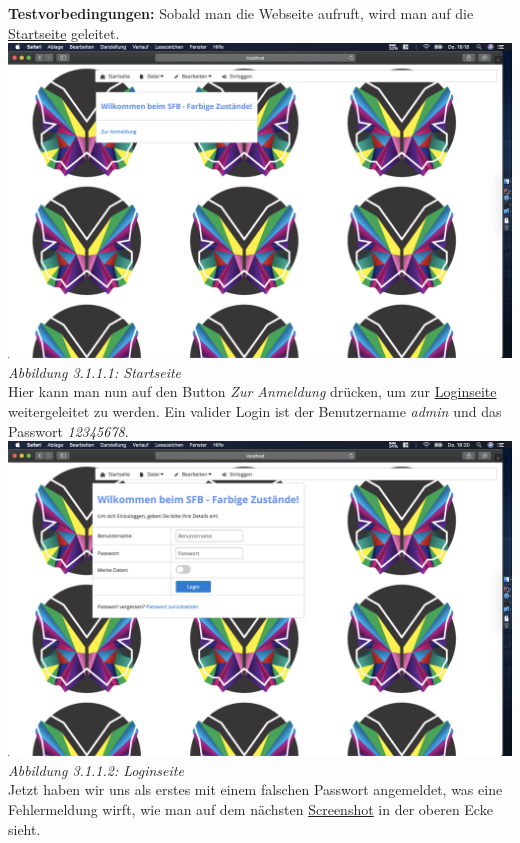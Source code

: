 \documentclass[enabledeprecatedfontcommands,fontsize=12pt,paper=a4,twoside]{scrartcl}
\begin{document}
\textbf{Testvorbedingungen:} Sobald man die Webseite aufruft, wird man auf die \hyperlink{sc3.1.1.1}{Startseite}  geleitet. \\

\hypertarget{sc3.1.1.1}{
\includegraphics[width=1\textwidth]{Screenshots/311StartSite.png}
\textit{Abbildung 3.1.1.1: Startseite}
} \\

Hier kann man nun auf den Button \textit{Zur Anmeldung} drücken, um zur \hyperlink{sc3.1.1.2}{Loginseite} weitergeleitet zu werden. Ein valider Login ist der Benutzername \textit{admin} und das Passwort \textit{12345678}. \\

\hypertarget{sc3.1.1.2}{
\includegraphics[width=1\textwidth]{Screenshots/311LoginSite.png}
\textit{Abbildung 3.1.1.2: Loginseite}
} \\

Jetzt haben wir uns als erstes mit einem falschen Passwort angemeldet, was eine Fehlermeldung wirft, wie man auf dem nächsten  \hyperlink{sc3.1.1.3}{Screenshot} in der oberen Ecke sieht.\\
\end{document}
